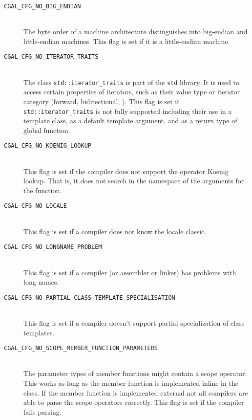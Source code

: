 \begin{description}
\item[{\tt CGAL\_CFG\_NO\_BIG\_ENDIAN}]~\\
  The byte order of a machine architecture distinguishes into
  big-endian and little-endian machines.  This flag is
  set if it is a little-endian machine.
 
\item[{\tt CGAL\_CFG\_NO\_ITERATOR\_TRAITS}]~\\
  The class \texttt{std::iterator\_traits} is part of the \texttt{std} library.
  It is used to access certain properties of iterators, such as their value
  type or iterator category (forward, bidirectional, \etc).
  This flag is set if \texttt{std::iterator\_traits} is not fully supported 
  including their use in a template class, as a default template
  argument, and as a return type of global function.

\item[{\tt CGAL\_CFG\_NO\_KOENIG\_LOOKUP}]~\\
 This flag is set if the compiler does not support the operator Koenig
 lookup. That is, it does not search in the namespace of the arguments for
 the function.

\item[{\tt CGAL\_CFG\_NO\_LOCALE}]~\\
 This flag is set if a compiler does not know the locale classic. 

\item[{\tt CGAL\_CFG\_NO\_LONGNAME\_PROBLEM}]~\\
 This flag is set if a compiler (or assembler or linker) has problems 
 with long names. 

\item[{\tt CGAL\_CFG\_NO\_PARTIAL\_CLASS\_TEMPLATE\_SPECIALISATION}]~\\
 This flag is set if a compiler doesn't support partial specialization 
 of class templates.

\item[{\tt CGAL\_CFG\_NO\_SCOPE\_MEMBER\_FUNCTION\_PARAMETERS}]~\\
 The parameter types of member functions might contain a scope
 operator. This works as long as the member function is implemented
 inline in the class. If the member function is implemented external
 not all compilers are able to parse the scope operators correctly.
 This flag is set if the compiler fails parsing.
 

\end{description}
